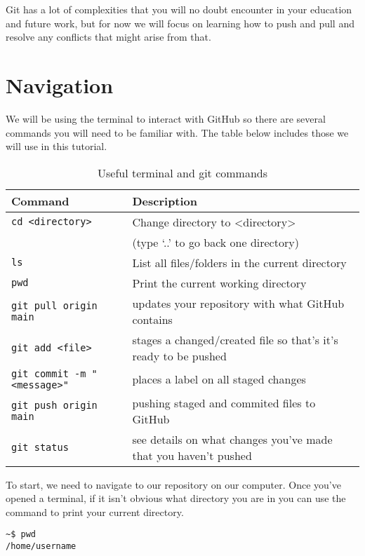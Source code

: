Git has a lot of complexities that you will no doubt encounter in your education and future work, 
but for now we will focus on learning how to push and pull and resolve any conflicts that might
arise from that. 

\section{Navigation}

We will be using the terminal to interact with GitHub so there are several commands you will need to be familiar with. The table below includes those we will use in this
tutorial.

\begin{table}[h!]
    \centering
    \caption{Useful terminal and git commands}
    \begin{tabular}{| m{4cm} | m{10cm} |}
    \hline
    \textbf{Command} & \textbf{Description} \\ 
    \hline
    \texttt{cd <directory>} & Change directory to <directory> \\ & (type `..' to go back one directory) \\ 
    \hline
    \texttt{ls} & List all files/folders in the current directory \\ 
    \hline
    \texttt{pwd} & Print the current working directory \\ 
    \hline
    \texttt{git pull origin main} & updates your repository with what GitHub contains \\ 
    \hline
    \texttt{git add <file>} & stages a changed/created file so that's it's ready to be pushed \\ 
    \hline
    \texttt{git commit -m "<message>"} & places a label on all staged changes \\ 
    \hline
    \texttt{git push origin main} & pushing staged and commited files to GitHub \\ 
    \hline
    \texttt{git status} & see details on what changes you've made that you haven't pushed \\
    \hline
\end{tabular}
\label{table:1}
\end{table}
    
To start, we need to navigate to our  repository on our computer.
Once you've opened a terminal, if it isn't obvious what directory you are in you can use the  command
to print your current directory.

\begin{lstlisting}
~$ pwd
/home/username
\end{lstlisting}


